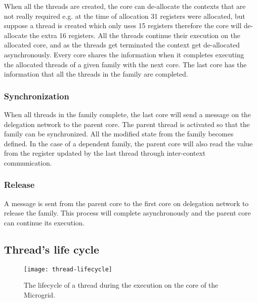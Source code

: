 \documentclass{article}
\begin{document}
When all the threads are created, the core can de-allocate the contexts that
are not really required e.g. at the time of allocation 31 registers were
allocated, but suppose a thread is created which only uses 15 registers
therefore the core will de-allocate the extra 16 registers. All the threads
continue their execution on the allocated core, and as the threads get
terminated the context get de-allocated asynchronously. Every core shares the
information when it completes executing the allocated threads of a given family
with the next core. The last core has the information that all the threads in
the family are completed.

\subsubsection*{Synchronization}

When all threads in the family complete, the last core will send a message on
the delegation network to the parent core. The parent thread is activated so
that the family can be synchronized. All the modified state from the family
becomes defined. In the case of a dependent family, the parent core will also
read the value from the register updated by the last thread through
inter-context communication.

\subsubsection*{Release}

A message is sent from the parent core to the first core on delegation network
to release the family. This process will complete asynchronously and the parent
core can continue its execution.

\subsection{Thread's life cycle}\label{sn:thread_lifecycle}

\begin{figure}
\begin{centering}
\label{Neighborhood}
    \texttt{[image: thread-lifecycle]}
    \caption{\label{fig:thread_lifecycle}The lifecycle of a thread during the execution on the core of the
    Microgrid.}
\end{centering}
\end{figure}
\end{document}
